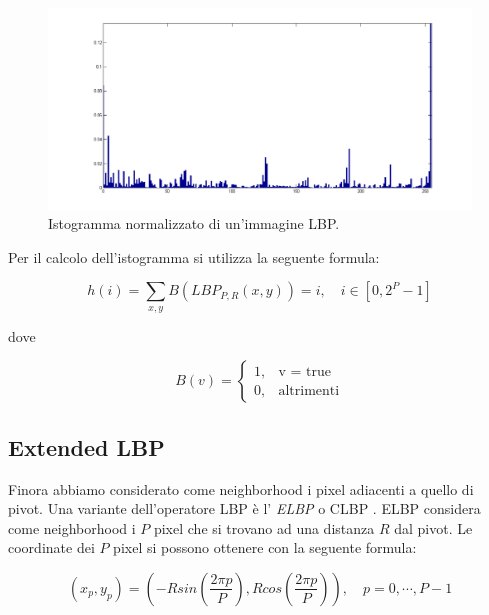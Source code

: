 \begin{figure}[ht]
\begin{center}
\includegraphics[width=1\textwidth]{img/hist-complete}
\caption{ Istogramma normalizzato di un'immagine LBP. }
\label{fig:istCompleteLBP}
\end{center}
\end{figure}

Per il calcolo dell'istogramma si utilizza la seguente formula:

\begin{equation}
h(i) = \sum_{x,y} B(LBP_{P,R}(x, y)) = i , \quad i \in  [0, 2^P-1 ]
\end{equation}

dove

\begin{equation}
B(v) = 	\begin{cases} 1, & \mbox{v = true} \\ 0, & \mbox{altrimenti} \end{cases}
\end{equation}

\subsection{Extended LBP}
\label{MLBP:extended}
Finora abbiamo considerato come neighborhood i pixel adiacenti a quello di pivot. Una variante dell'operatore \acs{LBP} è l' \emph{\acf{ELBP}} o \acf{CLBP} . \acs{ELBP} considera come neighborhood i $P$ pixel che si trovano ad una distanza $R$ dal pivot. Le coordinate dei $P$ pixel si possono ottenere con la seguente formula:

\begin{equation}
(x_p, y_p) = \left(  - Rsin\left( \frac{2\pi p}{P} \right), Rcos\left( \frac{2\pi p}{P} \right) \right)   , \quad p = 0, \cdots, P-1
\end{equation}

